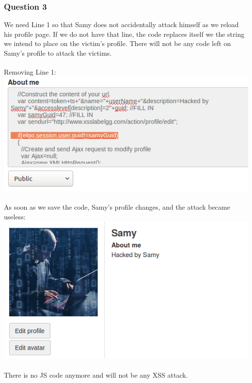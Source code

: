 \documentclass[a4paper]{article}
\begin{document}
\subsubsection{Question 3}
We need Line 1 so that Samy does not accidentally attack himself as we reload his profile page. If we do not have that line, the code replaces itself we the string we intend to place on the victim's profile. There will not be any code left on Samy's profile to attack the victims.\\\\
Removing Line 1:\\
\pagebreak
\includegraphics[scale=0.7]{2/23.png}\\\\
As soon as we save the code, Samy's profile changes, and the attack became useless:\\
\includegraphics[scale=0.7]{2/24.png}\\\\
There is no JS code anymore and will not be any XSS attack.
\end{document}
